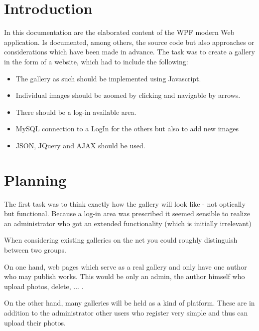 \documentclass[a4paper,12pt,oneside]{article} %
\begin{document}
  
  \tableofcontents
	\pagestyle{fancy}
   		
 \newpage %
  
 

  

\newpage

\section{Introduction}

In this documentation are the elaborated content of the WPF modern
Web application. Is documented, among others, the source code but
also approaches or considerations which have been made in advance.
The task was to create a gallery in the form of a website, which had
to include the following:
\begin{itemize}
\item The gallery as such should be implemented using Javascript. 
\item Individual images should be zoomed by clicking and navigable by arrows. 
\item There should be a log-in available area. 
\item MySQL connection to a LogIn for the others but also to add new images 
\item JSON, JQuery and AJAX should be used.
\end{itemize}

\section{Planning}

The first task was to think exactly how the gallery will look like
- not optically but functional. Because a log-in area was prescribed
it seemed sensible to realize an administrator who got an extended
functionality (which is initially irrelevant) 

When considering existing galleries on the net you could roughly distinguish
between two groups. 

On one hand, web pages which serve as a real gallery and only have
one author who may publish works. This would be only an admin, the
author himself who upload photos, delete, ... .

On the other hand, many galleries will be held as a kind of platform.
These are in addition to the administrator other users who register
very simple and thus can upload their photos.
\end{document}
